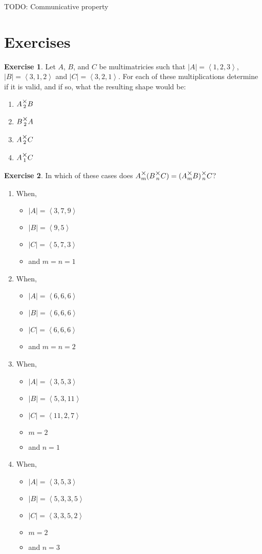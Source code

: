 \documentclass[12pt]{book}
\theoremstyle{plain}
\theoremstyle{definition}
\newtheorem{exercise}{Exercise}[chapter]
\theoremstyle{ppart}
\theoremstyle{case}
\theoremstyle{solution}
\newcommand{\mmult}[1]{\text{\raisebox{1ex}{$\underset{#1}{\times}$}}}
\begin{document}
TODO: Communicative property

\section{Exercises}

\begin{exercise}
Let $A$, $B$, and $C$ be multimatricies such that $|A| = \left<1,2,3\right>$,
$|B| = \left<3,1,2\right>$ and $|C| = \left<3,2,1\right>$. For each of these
multiplications determine if it is valid, and if so, what the resulting
shape would be:
\begin{enumerate}
\item $A \mmult{2} B$
\item $B \mmult{2} A$
\item $A \mmult{2} C$
\item $A \mmult{1} C$
\end{enumerate}
\end{exercise}

\begin{exercise}
In which of these cases does $A \mmult{m} (B \mmult{n} C) = (A \mmult{m} B) \mmult{n} C$?
\begin{enumerate}
\item When,
	\begin{itemize}
		\item $|A| = \left<3, 7, 9\right>$
		\item $|B| = \left<9, 5\right>$
		\item $|C| = \left<5, 7, 3\right>$
		\item and $m = n = 1$
	\end{itemize}
\item When,
	\begin{itemize}
		\item $|A| = \left<6, 6, 6\right>$
		\item $|B| = \left<6, 6, 6\right>$
		\item $|C| = \left<6, 6, 6\right>$
		\item and $m = n = 2$
	\end{itemize}
\item When,
	\begin{itemize}
		\item $|A| = \left<3, 5, 3\right>$
		\item $|B| = \left<5, 3, 11\right>$
		\item $|C| = \left<11, 2, 7\right>$
		\item $m = 2$
		\item and $n = 1$
	\end{itemize}
\item When,
	\begin{itemize}
		\item $|A| = \left<3, 5, 3\right>$
		\item $|B| = \left<5, 3, 3, 5\right>$
		\item $|C| = \left<3, 3, 5, 2\right>$
		\item $m = 2$
		\item and $n = 3$
	\end{itemize}
\end{enumerate}
\end{exercise}
\end{document}
